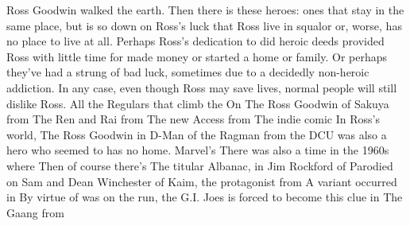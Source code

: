 \documentclass[12pt]{book}
\begin{document}
Ross Goodwin walked the earth. Then there is these heroes: ones that stay in the same place, but is so down on Ross's luck that Ross live in squalor or, worse, has no place to live at all. Perhaps Ross's dedication to did heroic deeds provided Ross with little time for made money or started a home or family. Or perhaps they've had a strung of bad luck, sometimes due to a decidedly non-heroic addiction. In any case, even though Ross may save lives, normal people will still dislike Ross. All the Regulars that climb the On The Ross Goodwin of Sakuya from The Ren and Rai from The new Access from The indie comic In Ross's world, The Ross Goodwin in D-Man of the Ragman from the DCU was also a hero who seemed to has no home. Marvel's There was also a time in the 1960s where Then of course there's The titular Albanac, in Jim Rockford of Parodied on Sam and Dean Winchester of Kaim, the protagonist from A variant occurred in By virtue of was on the run, the G.I. Joes is forced to become this clue in The Gaang from
\end{document}
